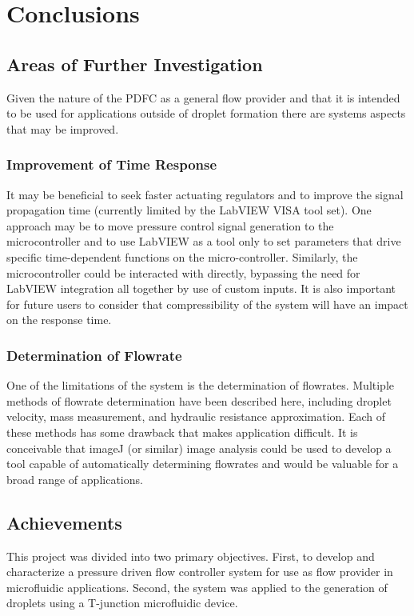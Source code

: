 \chapter{Conclusions}


\section{Areas of Further Investigation}

Given the nature of the PDFC as a general flow provider and that it is intended to be used for applications outside of droplet formation there are systems aspects that may be improved.

\subsection{Improvement of Time Response}
It may be beneficial to seek faster actuating regulators and to improve the signal propagation time (currently limited by the LabVIEW VISA tool set). One approach may be to move pressure control signal generation to the microcontroller and to use LabVIEW as a tool only to set parameters that drive specific time-dependent functions on the micro-controller. Similarly, the microcontroller could be interacted with directly, bypassing the need for LabVIEW integration all together by use of custom inputs. It is also important for future users to consider that compressibility of the system will have an impact on the response time.

\subsection{Determination of Flowrate}
One of the limitations of the system is the determination of flowrates. Multiple methods of flowrate determination have been described here, including droplet velocity, mass measurement, and hydraulic resistance approximation. Each of these methods has some drawback that makes application difficult. It is conceivable that imageJ (or similar) image analysis could be used to develop a tool capable of automatically determining flowrates and would be valuable for a broad range of applications.

\clearpage

\section{Achievements}
This project was divided into two primary objectives. First, to develop and characterize a pressure driven flow controller system for use as flow provider in microfluidic applications. Second, the system was applied to the generation of droplets using a T-junction microfluidic device.

